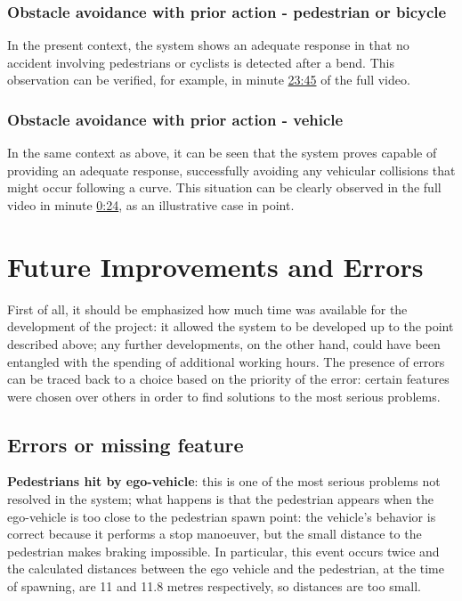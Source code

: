 \documentclass{article}
\begin{document}
\subsubsection{Obstacle avoidance with prior action - pedestrian or bicycle}
In the present context, the system shows an adequate response in that no accident involving pedestrians or cyclists is detected after a bend. This observation can
be verified, for example, in minute \href{https://youtu.be/RBGWd_so80U?t=1425}{23:45}  of the full video.
\subsubsection{Obstacle avoidance with prior action - vehicle}
In the same context as above, it can be seen that the system proves capable of providing an adequate response, successfully avoiding any vehicular collisions that might
occur following a curve. This situation can be clearly observed in the full video in minute \href{https://youtu.be/RBGWd_so80U?t=24}{0:24}, as an illustrative case in point.

\section{Future Improvements and Errors}
First of all, it should be emphasized how much time was available for the development of the project: it allowed the system to
be developed up to the point described above; any further developments, on the other hand, could have been entangled with the
spending of additional working hours.
The presence of errors can be traced back to a choice based on the priority of the error: certain features were chosen over
others in order to find solutions to the most serious problems.
\subsection{Errors or missing feature}
\textbf{Pedestrians hit by ego-vehicle}: this is one of the most serious problems not resolved in the system; what
    happens is that the pedestrian appears when the ego-vehicle is too close to the pedestrian spawn point: the vehicle's behavior
    is correct because it performs a stop manoeuver, but the small distance to the pedestrian makes braking impossible.
    In particular, this event occurs twice and the calculated distances between the ego vehicle and the pedestrian, at the time of spawning,
    are 11 and 11.8 metres respectively, so distances are too small.\newline
\end{document}
